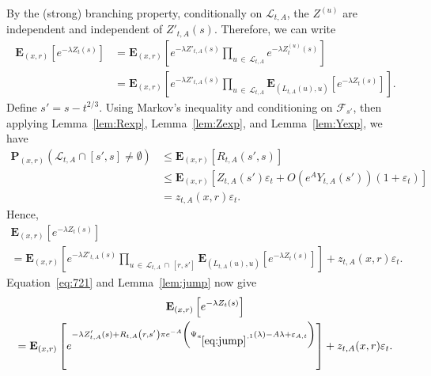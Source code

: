 \documentclass[AHL,Unicode,longabstracts,published]{cedram}
\newcommand*\eps{\varepsilon}
\newcommand*\E{\mathbf{E}}
\renewcommand*\P{\mathbf{P}}
\newcommand\F{\mathcal{F}}
\renewcommand{\L}{\mathcal{L}}
\newcommand{\1} {\mathds{1}}
\begin{document}
By the (strong) branching property, conditionally on $\L_{t,A}$, the $Z^{(u)}$ are independent and independent of $Z'_{t,A}(s)$. Therefore, we can write
\begin{align*}
\E_{(x,r)}\left[e^{-\lambda Z_t(s)}\right] &= \E_{(x,r)}\left[e^{-\lambda Z'_{t,A}(s)} \prod_{u\,\in\,\L_{t,A}} e^{-\lambda Z^{(u)}_t(s)}\right]\\
&= \E_{(x,r)}\left[e^{-\lambda Z'_{t,A}(s)} \prod_{u\,\in\,\L_{t,A}} \E_{\left(L_{t,A}(u),u\right)}\left[e^{-\lambda Z_t(s)}\right]\right].
\end{align*}
Define $s'=s-t^{2/3}$. Using Markov's inequality and conditioning on $\F_{s'}$, then applying Lemma~\ref{lem:Rexp}, Lemma~\ref{lem:Zexp}, and Lemma~\ref{lem:Yexp}, we have
\begin{align*}
\P_{(x,r)}\left(\L_{t,A} \cap \left[s',s\right]\ne \emptyset\right) &\le \E_{(x,r)}\left[R_{t,A}\left(s',s\right)\right] \\
&\le \E_{(x,r)}\left[Z_{t,A}(s')\eps_t + O\left(e^A Y_{t,A}\left(s'\right)\right)\left(1 + \eps_t\right)\right]\\
&= z_{t,A}(x,r)\eps_t.
\end{align*}
Hence,
\begin{multline}\label{eq:721}
\E_{(x,r)}\left[e^{-\lambda Z_t(s)}\right] \\
= \E_{(x,r)}\left[e^{-\lambda Z'_{t,A}(s)} \prod_{u\,\in\,\L_{t,A}\,\cap\,\left[r,s'\right]} \E_{\left(L_{t,A}(u),u\right)}\left[e^{-\lambda Z_t(s)}\right]\right] + z_{t,A}(x,r)\eps_t.
\end{multline}
Equation~\eqref{eq:721} and Lemma~\ref{lem:jump} now give
\begin{multline}\label{eq:722}
\E_{(x,r)}\left[e^{-\lambda Z_t(s)}\right]\\
 = \E_{(x,r)}\left[e^{-\lambda Z'_{t,A}(s) + R_{t,A}\left(r,s'\right)\pi e^{-A}\left(\Psi_{a_{\eqref{eq:jump}},1}(\lambda) - A\lambda + \eps_{A,t}\right)}\right] + z_{t,A}(x,r)\eps_t.
\end{multline}
\end{document}
